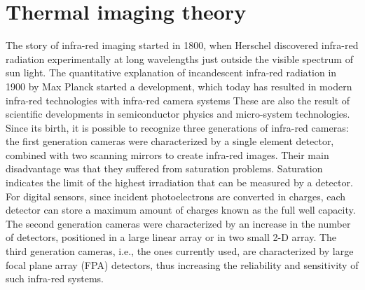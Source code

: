 \section{Thermal imaging theory}
\label{sec:theory}
The story of infra-red imaging started in 1800, when Herschel discovered 
infra-red radiation experimentally at long wavelengths just outside the visible 
spectrum of sun light.
The quantitative explanation of incandescent infra-red radiation in 1900 by Max 
Planck started a development, which today has resulted in modern infra-red 
technologies with infra-red camera systems These are also the result of 
scientific developments in semiconductor physics and micro-system 
technologies.\cite{10.1117/12.2266142}
Since its birth, it is possible to recognize three generations of infra-red 
cameras\cite{thermalimage}: the first generation cameras were characterized by 
a single element detector, combined with two scanning mirrors to create 
infra-red images. 
Their main disadvantage was that they suffered from saturation problems. 
Saturation indicates the limit of the highest irradiation that can be measured 
by a detector. For digital sensors, since incident photoelectrons are converted 
in charges, each detector can store a maximum amount of charges known as the 
full well capacity.\cite{10.1117/12.2266142}
The second generation cameras were characterized by an increase in the number 
of detectors, positioned in a large linear array or in two small 2-D array.
The third generation cameras, i.e., the ones currently used, are characterized 
by large focal plane array (FPA) detectors, thus increasing the reliability 
and sensitivity of such infra-red systems.\cite{rogalski2000infrared} 
%
